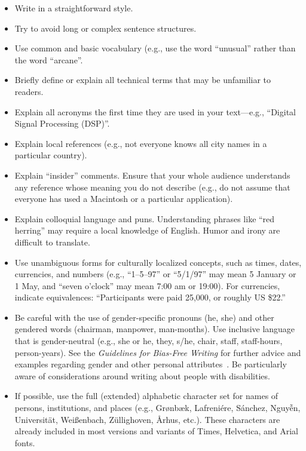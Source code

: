 \documentclass{sigchi}
\begin{document}
\begin{itemize}
\item Write in a straightforward style.
\item Try to avoid long or complex sentence structures.
\item Use common and basic vocabulary (e.g., use the word ``unusual'' rather than the word ``arcane''.
\item Briefly define or explain all technical terms that may be
  unfamiliar to readers.
\item Explain all acronyms the first time they are used in your
  text---e.g., ``Digital Signal Processing (DSP)''.
\item Explain local references (e.g., not everyone knows all city
  names in a particular country).
\item Explain ``insider'' comments. Ensure that your whole audience
  understands any reference whose meaning you do not describe (e.g.,
  do not assume that everyone has used a Macintosh or a particular
  application).
\item Explain colloquial language and puns. Understanding phrases like
  ``red herring'' may require a local knowledge of English.  Humor and
  irony are difficult to translate.
\item Use unambiguous forms for culturally localized concepts, such as
  times, dates, currencies, and numbers (e.g., ``1--5--97'' or
  ``5/1/97'' may mean 5 January or 1 May, and ``seven o'clock'' may
  mean 7:00 am or 19:00). For currencies, indicate equivalences:
  ``Participants were paid {\selectfont \textwon}
  25,000, or roughly US \$22.''
\item Be careful with the use of gender-specific pronouns (he, she)
  and other gendered words (chairman, manpower, man-months). Use
  inclusive language that is gender-neutral (e.g., she or he, they,
  s/he, chair, staff, staff-hours, person-years). See the
  \textit{Guidelines for Bias-Free Writing} for further advice and
  examples regarding gender and other personal
  attributes~. Be particularly aware of
  considerations around writing about people with disabilities.
\item If possible, use the full (extended) alphabetic character set
  for names of persons, institutions, and places (e.g.,
  Gr{\o}nb{\ae}k, Lafreni\'ere, S\'anchez, Nguy{\~{\^{e}}}n,
  Universit{\"a}t, Wei{\ss}enbach, Z{\"u}llighoven, \r{A}rhus, etc.).
  These characters are already included in most versions and variants
  of Times, Helvetica, and Arial fonts.
\end{itemize}
\end{document}
